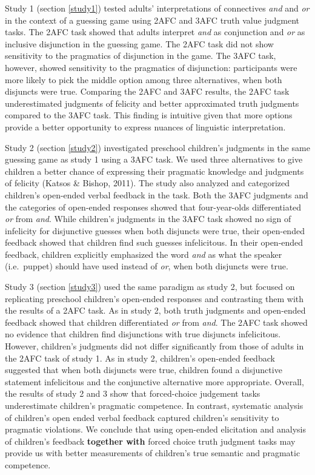 \documentclass[floatsintext,man]{apa6}
\theoremstyle{definition}
\theoremstyle{definition}
\theoremstyle{definition}
\theoremstyle{remark}
\begin{document}
Study 1 (section \ref{study1}) tested adults' interpretations of
connectives \emph{and} and \emph{or} in the context of a guessing game
using 2AFC and 3AFC truth value judgment tasks. The 2AFC task showed
that adults interpret \emph{and} as conjunction and \emph{or} as
inclusive disjunction in the guessing game. The 2AFC task did not show
sensitivity to the pragmatics of disjunction in the game. The 3AFC task,
however, showed sensitivity to the pragmatics of disjunction:
participants were more likely to pick the middle option among three
alternatives, when both disjuncts were true. Comparing the 2AFC and 3AFC
results, the 2AFC task underestimated judgments of felicity and better
approximated truth judgments compared to the 3AFC task. This finding is
intuitive given that more options provide a better opportunity to
express nuances of linguistic interpretation.

Study 2 (section \ref{study2}) investigated preschool children's
judgments in the same guessing game as study 1 using a 3AFC task. We
used three alternatives to give children a better chance of expressing
their pragmatic knowledge and judgments of felicity (Katsos \& Bishop,
2011). The study also analyzed and categorized children's open-ended
verbal feedback in the task. Both the 3AFC judgments and the categories
of open-ended responses showed that four-year-olds differentiated
\emph{or} from \emph{and}. While children's judgments in the 3AFC task
showed no sign of infelicity for disjunctive guesses when both disjuncts
were true, their open-ended feedback showed that children find such
guesses infelicitous. In their open-ended feedback, children explicitly
emphasized the word \emph{and} as what the speaker (i.e.~puppet) should
have used instead of \emph{or}, when both disjuncts were true.

Study 3 (section \ref{study3}) used the same paradigm as study 2, but
focused on replicating preschool children's open-ended responses and
contrasting them with the results of a 2AFC task. As in study 2, both
truth judgments and open-ended feedback showed that children
differentiated \emph{or} from \emph{and}. The 2AFC task showed no
evidence that children find disjunctions with true disjuncts
infelicitous. However, children's judgments did not differ significantly
from those of adults in the 2AFC task of study 1. As in study 2,
children's open-ended feedback suggested that when both disjuncts were
true, children found a disjunctive statement infelicitous and the
conjunctive alternative more appropriate. Overall, the results of study
2 and 3 show that forced-choice judgement tasks underestimate children's
pragmatic competence. In contrast, systematic analysis of children's
open ended verbal feedback captured children's sensitivity to pragmatic
violations. We conclude that using open-ended elicitation and analysis
of children's feedback \textbf{together with} forced choice truth
judgment tasks may provide us with better measurements of children's
true semantic and pragmatic competence.
\end{document}
